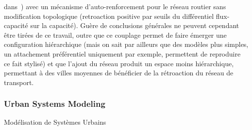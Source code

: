 { dans~\cite{sanders1992systeme}) avec un mécanisme d'auto-renforcement pour le réseau routier sans modification topologique (retroaction positive par seuils du différentiel flux-capacité sur la capacité). Guère de conclusions générales ne peuvent cependant être tirées de ce travail, outre que ce couplage permet de faire émerger une configuration hiérarchique (mais on sait par ailleurs que des modèles plus simples, un attachement préférentiel uniquement par exemple, permettent de reproduire ce fait stylisé) et que l'ajout du réseau produit un espace moins hiérarchique, permettant à des villes moyennes de bénéficier de la rétroaction du réseau de transport.
}








\subsubsection{Urban Systems Modeling}{Modélisation de Systèmes Urbains}



